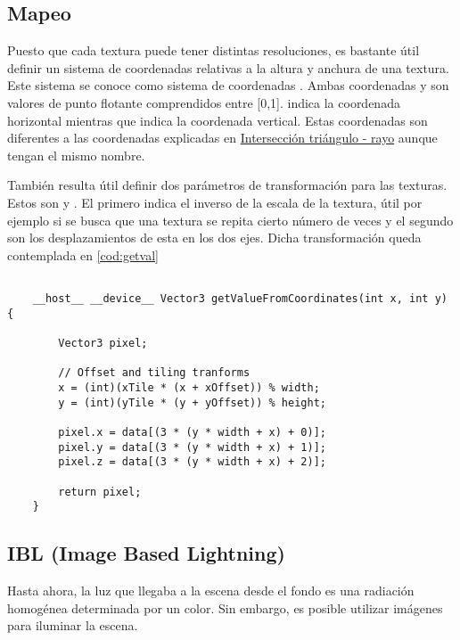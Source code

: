 \subsection{Mapeo}

Puesto que cada textura puede tener distintas resoluciones, es bastante útil definir un sistema de coordenadas relativas a la altura y anchura de una textura. Este sistema se conoce como sistema de coordenadas . Ambas coordenadas  y  son valores de punto flotante comprendidos entre [0,1].  indica la coordenada horizontal mientras que  indica la coordenada vertical. Estas coordenadas son diferentes a las coordenadas  explicadas en \hyperref[subsec:triintersection]{Intersección triángulo - rayo} aunque tengan el mismo nombre.

También resulta útil definir dos parámetros de transformación para las texturas. Estos son  y . El primero indica el inverso de la escala de la textura, útil por ejemplo si se busca que una textura se repita cierto número de veces y el segundo son los desplazamientos de esta en los dos ejes. Dicha transformación queda contemplada en \autoref{cod:getval}

\begin{minipage}[c]{0.95\textwidth}
\begin{lstlisting}[label={cod:getval}, caption={Código para obtener valor de una textura}]
	
	__host__ __device__ Vector3 getValueFromCoordinates(int x, int y) {
	
        Vector3 pixel;

        // Offset and tiling tranforms
        x = (int)(xTile * (x + xOffset)) % width;
        y = (int)(yTile * (y + yOffset)) % height;

        pixel.x = data[(3 * (y * width + x) + 0)];
        pixel.y = data[(3 * (y * width + x) + 1)];
        pixel.z = data[(3 * (y * width + x) + 2)];

        return pixel;
    }
\end{lstlisting}
\end{minipage}

\subsection{IBL (Image Based Lightning)}
	
Hasta ahora, la luz que llegaba a la escena desde el fondo es una radiación homogénea determinada por un color. Sin embargo, es posible utilizar imágenes para iluminar la escena.
	
